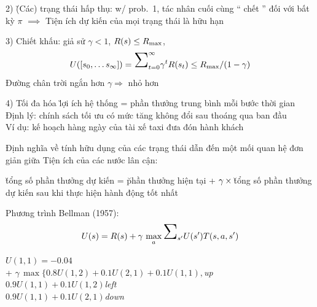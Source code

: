 \documentclass{article}
\begin{document}
\begin{huge}
2) \u{(Các) trạng thái hấp thụ}: w/ prob.~1, tác nhân cuối cùng `` chết '' đối với bất kỳ $\pi$\al
  $\implies$ Tiện ích dự kiến của mọi trạng thái là hữu hạn

3) Chiết khấu: giả sử $\gamma<1$, $R(s) \leq R_{{\rm max}}$,
\[ U([s_0,\ldots s_{\infty}]) = \mysum_{t=0}^{\infty} \gamma^t R(s_t) \leq R_{{\rm max}}/(1-\gamma)\]
Đường chân trời ngắn hơn $\gamma \Rightarrow {}$ nhỏ hơn

4) Tối đa hóa \u{lợi ích hệ thống} = phần thưởng trung bình mỗi bước thời gian\\
Định lý: chính sách tối ưu có mức tăng không đổi sau thoáng qua ban đầu\\
Ví dụ: kế hoạch hàng ngày của tài xế taxi đưa đón hành khách




Định nghĩa về tính hữu dụng của các trạng thái dẫn đến một mối quan hệ đơn giản giữa
Tiện ích của các nước lân cận:

\u{tổng số phần thưởng dự kiến}\al
= \u{phần thưởng hiện tại}\nl
+ $\gamma {\,\times\,}{}$\u{tổng số phần thưởng dự kiến sau khi thực hiện hành động tốt nhất}

Phương trình Bellman (1957):
\[ U(s) = R(s) + \gamma\,\max_a \mysum_{s'} U(s') T(s,a,s')\]

$U(1,1) = -0.04$\\
\tab + $\gamma\,\max\{ 0.8 U(1,2) + 0.1 U(2,1) + 0.1 U(1,1),$\hfill{\em up\\
\tab \phantom{+ \mbox{$\max\{$}}$0.9 U(1,1) + 0.1 U(1,2) $\hfill{\em left\\
\tab \phantom{+ \mbox{$\max\{$}}$0.9 U(1,1) + 0.1 U(2,1) $\hfill{\em down\\
\tab {}}}}
\end{huge}
\end{document}
